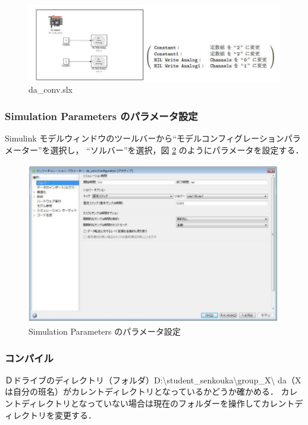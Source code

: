     \begin{figure}[H]
        \centering
        \includegraphics[width=0.9\linewidth]{figure/da_conv.pdf}
        \caption{da\_conv.slx}
        \label{fig:da_conv}
    \end{figure}
    
    \subsubsection{Simulation Parameters のパラメータ設定}

    Simulink モデルウィンドウのツールバーから``モデルコンフィグレーションパラメーター''を選択し，
    ``ソルバー''を選択，図 \ref{fig:sim_param} のようにパラメータを設定する．
    
    \begin{figure}[H]
        \centering
        \includegraphics[width=0.8\linewidth]{figure/sim_param.pdf}
        \caption{Simulation Parameters のパラメータ設定}
        \label{fig:sim_param}
    \end{figure}
    
    \subsubsection{コンパイル}
    Ｄドライブのディレクトリ（フォルダ）D:\textbackslash student\_senkouka\textbackslash group\_X\textbackslash 
    da（Xは自分の班名）がカレントディレクトリとなっているかどうか確かめる．
    カレントディレクトリとなっていない場合は現在のフォルダーを操作してカレントディレクトリを変更する．
    
